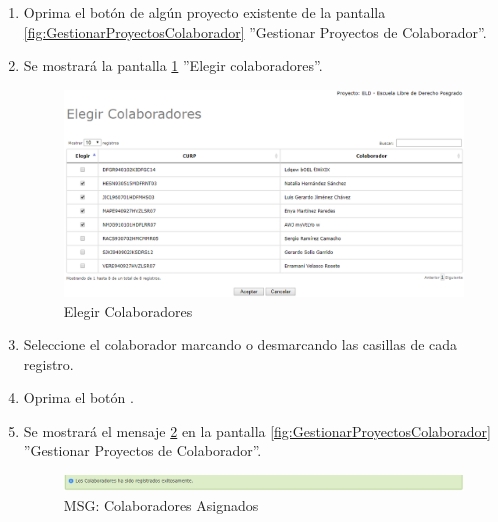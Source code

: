 			\begin{enumerate}
	
			\item Oprima el botón \IUAsignar{} de algún proyecto existente de la pantalla \ref{fig:GestionarProyectosColaborador} ''Gestionar Proyectos de Colaborador''.
	
			\item Se mostrará la pantalla \ref{fig:elegirColaboradores} ''Elegir colaboradores''.
			
			\begin{figure}[htbp!]
				\begin{center}
					\includegraphics[scale=0.6]{roles/lider/proyectosColaborador/pantallas/IU4-1elegirColaboradores}
					\caption{Elegir Colaboradores}
					\label{fig:elegirColaboradores}
				\end{center}
			\end{figure}
		
			\item Seleccione el colaborador marcando o desmarcando las casillas de cada registro.
						
			\item Oprima el botón \IUAceptar.
			
			\item Se mostrará el mensaje \ref{fig:colaboradorElegido} en la pantalla \ref{fig:GestionarProyectosColaborador} ''Gestionar Proyectos de Colaborador''.
			
			\begin{figure}[htbp!]
				\begin{center}
					\includegraphics[scale=0.6]{roles/lider/proyectosColaborador/pantallas/IU4-1MSG1}
					\caption{MSG: Colaboradores Asignados}
					\label{fig:colaboradorElegido}
				\end{center}
			\end{figure}
			\end{enumerate}